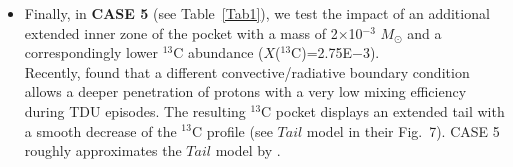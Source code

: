 \documentclass[manuscript]{aastex}
\begin{document}
\begin{itemize}
(see Table~\ref{Tab1}). 
\\
This test simulates the recent prescriptions of
updated FRUITY\footnote{web: fruity.oa-teramo.inaf.it/.} models by \citet{cristallo09,cristallo11}.
FRUITY models include an efficient AGB mass-loss rate, which has been calibrated 
using the infrared luminosity function of Galactic carbon stars, 
and improved radiative C-enhanced opacity tables. 
Accordingly, these new models with a reduced number of TDU episodes are  
in better agreement with observations 
(\citealt{guandalini13} and references therein). 
\item Finally, in {\bf CASE 5} (see Table~\ref{Tab1}), we test the impact of an additional extended
inner zone of the pocket with a mass of 2$\times$10$^{-3}$ $M_\odot$ and a correspondingly lower
$^{13}$C abundance ($X$($^{13}$C)=2.75E$-3$).
\\
Recently,
\citet{cristallo15} 
found that a different convective/radiative boundary condition 
allows a deeper penetration of protons with a very low mixing efficiency during TDU episodes.
The resulting $^{13}$C pocket displays an extended tail with a smooth decrease of the $^{13}$C 
profile (see $Tail$ model in their Fig.~7). 
CASE 5 roughly approximates the $Tail$ model by \citet{cristallo15}.
\end{itemize}


 
\end{document}
